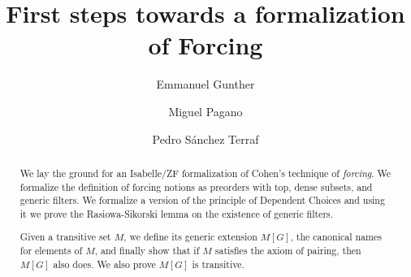 \documentclass{article}
\begin{document}
\title{First steps towards a formalization of Forcing}
\author{Emmanuel Gunther
  \and 
  Miguel Pagano
  \and 
  Pedro S\'anchez Terraf}
\maketitle

\begin{abstract} 
  We lay the ground for an Isabelle/ZF formalization of Cohen's technique of
  \emph{forcing}. We formalize the definition of forcing notions as
  preorders with top, dense subsets, and generic filters. We formalize
  a version of the principle of Dependent Choices and using it
  we prove the Rasiowa-Sikorski lemma on the existence of generic filters.
  
  Given a transitive set $M$, we define its generic extension $M[G]$,
  the canonical names for elements of $M$, and finally show that if $M$
  satisfies the axiom of pairing, then $M[G]$ also does. We also prove
  $M[G]$ is transitive.
\end{abstract}



% 




















%
%

\end{document}
